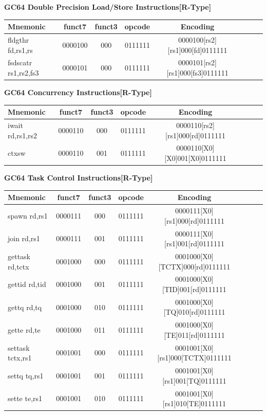 \documentclass{article}
\begin{document}
\begin{center}
\begin{small}
\textbf{GC64 Double Precision Load/Store Instructions[R-Type]}
\begin{tabular}{| l | c | c | c | c | c | c || r}
\hline
Mnemonic & funct7 & funct3 & opcode & Encoding \\ \hline
\hline
fldgthr fd,rs1,rs & 0000100 & 000 & 0111111 & 0000100[rs2][rs1]000[fd]0111111 \\ 
\hline
fsdscatr rs1,rs2,fs3 & 0000101 & 000 & 0111111 & 0000101[rs2][rs1]000[fs3]0111111 \\ 
\hline
\end{tabular}

\vspace{10 mm}

\textbf{GC64 Concurrency Instructions[R-Type]}
\begin{tabular}{| l | c | c | c | c | c | c || r}
\hline
Mnemonic & funct7 & funct3 & opcode & Encoding \\ \hline
\hline
iwait rd,rs1,rs2 & 0000110 & 000 & 0111111 & 0000110[rs2][rs1]000[rd]0111111 \\ 
\hline
ctxsw & 0000110 & 001 & 0111111 & 0000110[X0][X0]001[X0]0111111 \\ 
\hline
\end{tabular}

\vspace{10 mm}

\textbf{GC64 Task Control Instructions[R-Type]}
\begin{tabular}{| l | c | c | c | c | c | c || r}
\hline
Mnemonic & funct7 & funct3 & opcode & Encoding \\ \hline
\hline
spawn rd,rs1 & 0000111 & 000 & 0111111 & 0000111[X0][rs1]000[rd]0111111 \\ 
\hline
join rd,rs1 & 0000111 & 001 & 0111111 & 0000111[X0][rs1]001[rd]0111111 \\ 
\hline
gettask rd,tctx & 0001000 & 000 & 0111111 & 0001000[X0][TCTX]000[rd]0111111 \\ 
\hline
gettid rd,tid & 0001000 & 001 & 0111111 & 0001000[X0][TID]001[rd]0111111 \\ 
\hline
gettq rd,tq & 0001000 & 010 & 0111111 & 0001000[X0][TQ]010[rd]0111111 \\ 
\hline
gette rd,te & 0001000 & 011 & 0111111 & 0001000[X0][TE]011[rd]0111111 \\ 
\hline
settask tctx,rs1 & 0001001 & 000 & 0111111 & 0001001[X0][rs1]000[TCTX]0111111 \\ 
\hline
settq tq,rs1 & 0001001 & 001 & 0111111 & 0001001[X0][rs1]001[TQ]0111111 \\ 
\hline
sette te,rs1 & 0001001 & 010 & 0111111 & 0001001[X0][rs1]010[TE]0111111 \\ 
\hline
\end{tabular}


\end{small}
\end{center}
\end{document}
